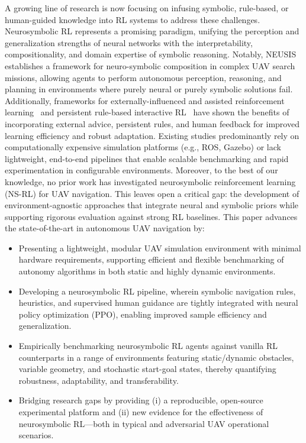 \documentclass[pdflatex,sn-mathphys-num]{sn-jnl}
\theoremstyle{thmstyleone}%
\theoremstyle{thmstyletwo}%
\theoremstyle{thmstylethree}%
\begin{document}
A growing line of research is now focusing on infusing symbolic, rule-based, or human-guided knowledge into RL systems to address these challenges. Neurosymbolic RL represents a promising paradigm, unifying the perception and generalization strengths of neural networks with the interpretability, compositionality, and domain expertise of symbolic reasoning. Notably, NEUSIS~\cite{cai2025neusis} establishes a framework for neuro-symbolic composition in complex UAV search missions, allowing agents to perform autonomous perception, reasoning, and planning in environments where purely neural or purely symbolic solutions fail. Additionally, frameworks for externally-influenced and assisted reinforcement learning~\cite{bignold2023conceptual} and persistent rule-based interactive RL~\cite{bignold2023persistent} have shown the benefits of incorporating external advice, persistent rules, and human feedback for improved learning efficiency and robust adaptation. Existing studies predominantly rely on computationally expensive simulation platforms (e.g., ROS, Gazebo) or lack lightweight, end-to-end pipelines that enable scalable benchmarking and rapid experimentation in configurable environments. Moreover, to the best of our knowledge, no prior work has investigated neurosymbolic reinforcement learning (NS-RL) for UAV navigation. This leaves open a critical gap: the development of environment-agnostic approaches that integrate neural and symbolic priors while supporting rigorous evaluation against strong RL baselines. This paper advances the state-of-the-art in autonomous UAV navigation by:

\begin{itemize}
\item Presenting a lightweight, modular UAV simulation environment with minimal hardware requirements, supporting efficient and flexible benchmarking of autonomy algorithms in both static and highly dynamic environments.
\item Developing a neurosymbolic RL pipeline, wherein symbolic navigation rules, heuristics, and supervised human guidance are tightly integrated with neural policy optimization (PPO), enabling improved sample efficiency and generalization.
\item Empirically benchmarking neurosymbolic RL agents against vanilla RL counterparts in a range of environments featuring static/dynamic obstacles, variable geometry, and stochastic start-goal states, thereby quantifying robustness, adaptability, and transferability.
\item Bridging research gaps by providing (i) a reproducible, open-source experimental platform and (ii) new evidence for the effectiveness of neurosymbolic RL—both in typical and adversarial UAV operational scenarios.
\end{itemize}
\end{document}
